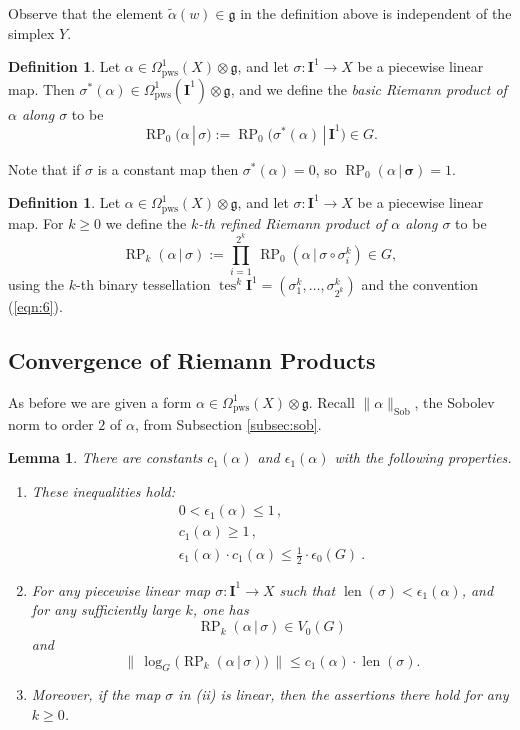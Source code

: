 \documentclass[10pt, a4paper]{amsart}
\newtheorem{lem}[equation]{Lemma}
\theoremstyle{definition}
\newtheorem{dfn}[equation]{Definition}
\numberwithin{equation}{section}
\newcommand{\opn}{\operatorname}
\newcommand{\rmitem}[1]{\item[\text{\textup{(#1)}}]}
\newcommand{\mfrak}[1]{\mathfrak{#1}}
\newcommand{\mbf}[1]{\mathbf{#1}}
\newcommand{\mrm}[1]{\mathrm{#1}}
\newcommand{\smfrac}[2]{{\textstyle \frac{#1}{#2}}}
\newcommand{\tup}[1]{\textup{#1}}
\newcommand{\bsym}[1]{\boldsymbol{#1}}
\newcommand{\til}[1]{\tilde{#1}}
\newcommand{\norm}[1]{\lVert #1 \rVert}
\renewcommand{\vert}{\, | \,}
\newcommand{\g}{\mfrak{g}}
\begin{document}
Observe that the element $\til{\alpha}(w) \in \g$ in the definition above is
independent of
the simplex $Y$. 

\begin{dfn} \label{dfn:12}
Let 
$\alpha \in \Omega^1_{\mrm{pws}}(X) \otimes \mfrak{g}$,
and let $\sigma : \mbf{I}^{1} \to X$ be a piecewise linear map. Then
$\sigma^*(\alpha) \in \Omega^1_{\mrm{pws}}(\mbf{I}^1) \otimes \mfrak{g}$,
and we define the 
{\em basic Riemann product of $\alpha$ along $\sigma$} to be 
\[ \opn{RP}_{0}(\alpha \vert \sigma) :=
\opn{RP}_{0} \bigl( \sigma^*(\alpha) \vert \mbf{I}^{1} \bigr) \in G . \]
\end{dfn}

Note that if $\sigma$ is a constant map then 
$\sigma^*(\alpha) = 0$, so 
$\opn{RP}_{0}(\alpha \vert \bsym{\sigma}) = 1$.

\begin{dfn} \label{dfn:2}
Let 
$\alpha \in \Omega^1_{\mrm{pws}}(X) \otimes \mfrak{g}$,
and let $\sigma : \mbf{I}^{1} \to X$ be a piecewise linear map.
For $k \geq 0$ we define the {\em $k$-th refined Riemann product of $\alpha$
along $\sigma$} to be 
\[ \opn{RP}_{k}(\alpha \vert \sigma) :=
\prod_{i = 1}^{2^k} \,
\opn{RP}_{0} ( \alpha \vert \sigma \circ \sigma^k_i ) \in G , \]
using the $k$-th binary tessellation
$\opn{tes}^k \mbf{I}^1 = ( \sigma^k_1, \ldots, \sigma^k_{2^k})$
and the convention (\ref{eqn:6}).
\end{dfn}

\subsection{Convergence of Riemann Products}
As before we are given a form
$\alpha \in \Omega^1_{\mrm{pws}}(X) \otimes \g$. 
Recall $\norm{\alpha}_{\mrm{Sob}}$, the Sobolev norm to order $2$ of $\alpha$,
from Subsection \ref{subsec:sob}.

\begin{lem} \label{lem:1}
There are constants $c_1(\alpha)$ and $\epsilon_1(\alpha)$ with the
following properties.
\begin{enumerate}
\rmitem{i} These inequalities hold:
\begin{gather*}
0 < \epsilon_1(\alpha) \leq 1 \, , \\
c_1(\alpha) \geq 1 \, , \\
\epsilon_1(\alpha) \cdot c_1(\alpha) \leq \smfrac{1}{2} \cdot
\epsilon_0(G) \ .
\end{gather*}

\rmitem{ii} For any piecewise linear map 
$\sigma : \mbf{I}^1 \to X$ 
such that $\opn{len}(\sigma) < \epsilon_1(\alpha)$, and for any sufficiently
large $k$, one has
\[ \opn{RP}_{k}(\alpha \vert \sigma) \in V_0(G)  \]
and 
\[ \norm{\, \opn{log}_G \bigl( 
\opn{RP}_{k}(\alpha \vert \sigma) \bigr) \, }
\leq c_1(\alpha) \cdot \opn{len}(\sigma) . \]

\rmitem{iii} Moreover, if the map $\sigma$ in \tup{(ii)} is linear, then the
assertions there hold for any $k \geq 0$.
\end{enumerate} 
\end{lem}
\end{document}
